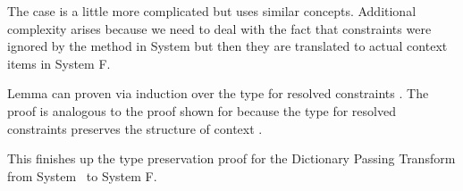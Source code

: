 \noindent The case    is a little more complicated but uses similar concepts.
Additional complexity arises because we need to deal with the fact that constraints were ignored by the  method in System \Fo but then they are translated to actual context items in System F.

\noindent Lemma  can proven via induction over the type for resolved constraints \Data{[}  \Data{]∈} . 
The proof is analogous to the proof shown for  because the type for resolved constraints preserves the structure of context . 

\noindent This finishes up the type preservation proof for the Dictionary Passing Transform from System \Fo\ to System F.